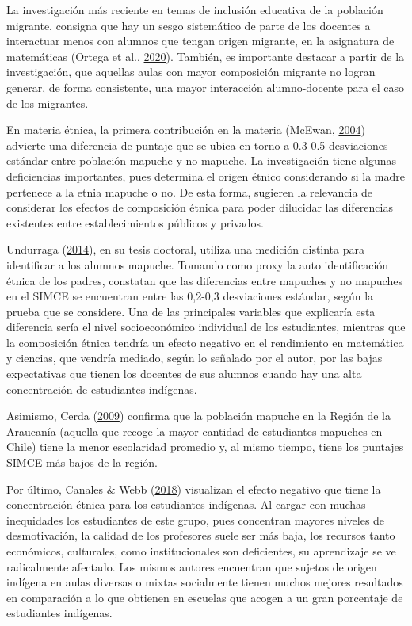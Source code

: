 \documentclass[
]{article}
\begin{document}
La investigación más reciente en temas de inclusión educativa de la
población migrante, consigna que hay un sesgo sistemático de parte de
los docentes a interactuar menos con alumnos que tengan origen migrante,
en la asignatura de matemáticas (Ortega et al.,
\protect\hyperlink{ref-ortega_centrality_2020}{2020}). También, es
importante destacar a partir de la investigación, que aquellas aulas con
mayor composición migrante no logran generar, de forma consistente, una
mayor interacción alumno-docente para el caso de los migrantes.

En materia étnica, la primera contribución en la materia (McEwan,
\protect\hyperlink{ref-mcewan_indigenous_2004}{2004}) advierte una
diferencia de puntaje que se ubica en torno a 0.3-0.5 desviaciones
estándar entre población mapuche y no mapuche. La investigación tiene
algunas deficiencias importantes, pues determina el origen étnico
considerando si la madre pertenece a la etnia mapuche o no. De esta
forma, sugieren la relevancia de considerar los efectos de composición
étnica para poder dilucidar las diferencias existentes entre
establecimientos públicos y privados.

Undurraga (\protect\hyperlink{ref-undurraga_unraveling_2014}{2014}), en
su tesis doctoral, utiliza una medición distinta para identificar a los
alumnos mapuche. Tomando como proxy la auto identificación étnica de los
padres, constatan que las diferencias entre mapuches y no mapuches en el
SIMCE se encuentran entre las 0,2-0,3 desviaciones estándar, según la
prueba que se considere. Una de las principales variables que explicaría
esta diferencia sería el nivel socioeconómico individual de los
estudiantes, mientras que la composición étnica tendría un efecto
negativo en el rendimiento en matemática y ciencias, que vendría
mediado, según lo señalado por el autor, por las bajas expectativas que
tienen los docentes de sus alumnos cuando hay una alta concentración de
estudiantes indígenas.

Asimismo, Cerda (\protect\hyperlink{ref-cerda_situacion_2009}{2009})
confirma que la población mapuche en la Región de la Araucanía (aquella
que recoge la mayor cantidad de estudiantes mapuches en Chile) tiene la
menor escolaridad promedio y, al mismo tiempo, tiene los puntajes SIMCE
más bajos de la región.

Por último, Canales \& Webb
(\protect\hyperlink{ref-canales_educational_2018}{2018}) visualizan el
efecto negativo que tiene la concentración étnica para los estudiantes
indígenas. Al cargar con muchas inequidades los estudiantes de este
grupo, pues concentran mayores niveles de desmotivación, la calidad de
los profesores suele ser más baja, los recursos tanto económicos,
culturales, como institucionales son deficientes, su aprendizaje se ve
radicalmente afectado. Los mismos autores encuentran que sujetos de
origen indígena en aulas diversas o mixtas socialmente tienen muchos
mejores resultados en comparación a lo que obtienen en escuelas que
acogen a un gran porcentaje de estudiantes indígenas.
\end{document}
